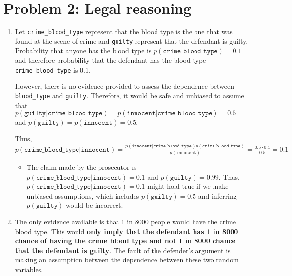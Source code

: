 \section{Problem 2: Legal reasoning}
	
	\begin{enumerate}
	
		\item 
			Let \texttt{crime\_blood\_type} represent that the blood type is the one that was found at the scene of crime and \texttt{guilty} represent that the defendant is guilty. Probability that anyone has the blood type is $p(\texttt{crime\_blood\_type}) = 0.1$ and therefore probability that the defendant has the blood type \texttt{crime\_blood\_type} is 0.1. 
			\par
			However, there is no evidence provided to assess the dependence between \texttt{blood\_type} and \texttt{guilty}. Therefore, it would be safe and unbiased to assume that $p(\texttt{guilty} | \texttt{crime\_blood\_type}) = p(\texttt{innocent} | \texttt{crime\_blood\_type}) = 0.5$ and $p(\texttt{guilty}) = p(\texttt{innocent}) = 0.5$.		
			\par
			Thus, \\
			$p(\texttt{crime\_blood\_type} | \texttt{innocent}) = \frac{p(\texttt{innocent} | \texttt{crime\_blood\_type})p(\texttt{crime\_blood\_type})}{p(\texttt{innocent})} =  \frac{0.5 \cdot 0.1}{0.5} = 0.1$		
			\begin{itemize}
				\item The claim made by the prosecutor is $p(\texttt{crime\_blood\_type} | \texttt{innocent}) = 0.1$ and $p(\texttt{guilty}) = 0.99$. Thus, $p(\texttt{crime\_blood\_type} | \texttt{innocent}) = 0.1$ might hold true if we make unbiased assumptions, which includes $p(\texttt{guilty}) = 0.5$ and inferring $p(\texttt{guilty})$ would be incorrect.
			\end{itemize}
			
		\item
			The only evidence available is that 1 in 8000 people would have the crime blood type. This would \textbf{only imply that the defendant has 1 in 8000 chance of having the crime blood type and not 1 in 8000 chance that the defendant is guilty}. The fault of the defender's argument is making an assumption between the dependence between these two random variables.
			
	\end{enumerate}